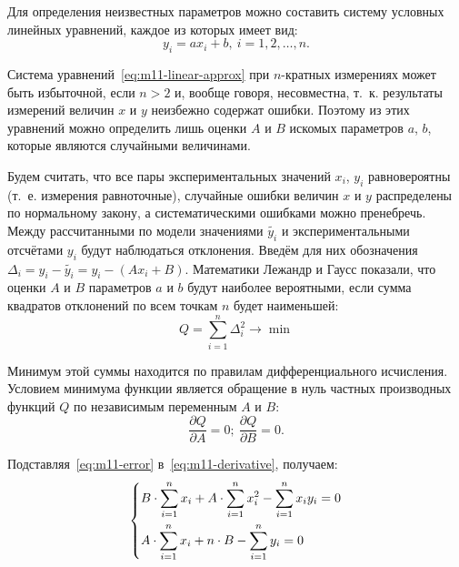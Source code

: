 \documentclass[a4paper, 12pt]{extarticle}
\newcommand{\isum}{\sum\limits_{i=1}^{n}}
\begin{document}
Для определения неизвестных параметров можно составить систему условных линейных уравнений, каждое из которых имеет вид: %
\begin{equation}
\label{eq:m11-linear-approx}
y_i = a x_i + b,\ i = 1, 2, \ldots, n. %
\end{equation}

Система уравнений~\eqref{eq:m11-linear-approx} при $n$-кратных измерениях может быть избыточной, если $n >2$ и, вообще говоря, несовместна, т.~к. результаты измерений величин $x$ и $y$ неизбежно содержат ошибки. Поэтому из этих уравнений можно определить лишь оценки $A$ и $B$ искомых параметров $a$, $b$, которые являются случайными величинами. %

Будем считать, что все пары экспериментальных значений $x_i$, $y_i$  равновероятны (т.~е. измерения равноточные), случайные ошибки величин $x$ и $y$ распределены по нормальному закону, а систематическими ошибками можно пренебречь. Между рассчитанными по модели значениями $\widetilde{y_i}$ и экспериментальными отсчётами $y_i$ будут наблюдаться отклонения. Введём для них обозначения $\Delta_i = y_i - \widetilde{y_i} = y_i - (A  x_i + B)$. %
Математики Лежандр и Гаусс показали, что оценки $A$ и $B$ параметров $a$ и $b$  будут наиболее вероятными, если сумма квадратов отклонений по всем точкам $n$ будет наименьшей: %
\begin{equation}
\label{eq:m11-error}
Q = \isum \Delta_i^2 \to \min
\end{equation}

Минимум этой суммы находится по правилам дифференциального исчисления. Условием минимума функции является обращение в нуль частных производных функций $Q$ по независимым переменным $A$ и $B$:  %
\begin{equation}
\label{eq:m11-derivative}
\frac{\partial Q}{\partial A} = 0; \ \frac{\partial Q}{\partial B} = 0. %
\end{equation}

Подставляя~\eqref{eq:m11-error} в~\eqref{eq:m11-derivative}, получаем: %
\begin{equation}
\label{eq:m11-system}
\left\{ \aligned
&B \cdot \isum x_i + A \cdot \isum x_i^2 - \isum x_i y_i = 0 \\ %
&A \cdot \isum x_i + n \cdot B - \isum y_i = 0  %
\endaligned \right.
\end{equation}
\end{document}
